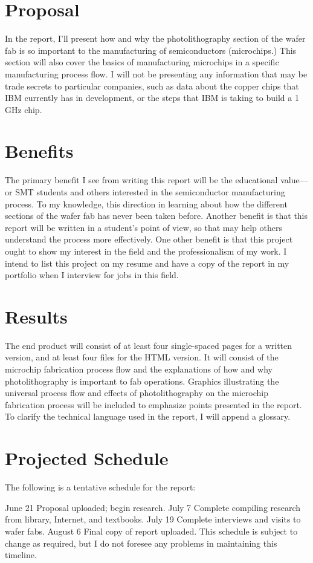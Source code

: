 \section*{Proposal}
In the report, I'll present how and why the photolithography section of the wafer fab is so important to the manufacturing of semiconductors (microchips.) This section will also cover the basics of manufacturing microchips in a specific manufacturing process flow. I will not be presenting any information that may be trade secrets to particular companies, such as data about the copper chips that IBM currently has in development, or the steps that IBM is taking to build a 1 GHz chip.
\section*{Benefits}
The primary benefit I see from writing this report will be the educational value—or SMT students and others interested in the semiconductor manufacturing process. To my knowledge, this direction in learning about how the different sections of the wafer fab has never been taken before. Another benefit is that this report will be written in a student's point of view, so that may help others understand the process more effectively. One other benefit is that this project ought to show my interest in the field and the professionalism of my work. I intend to list this project on my resume and have a copy of the report in my portfolio when I interview for jobs in this field.
\section*{Results}
The end product will consist of at least four single-spaced pages for a written version, and at least four files for the HTML version. It will consist of the microchip fabrication process flow and the explanations of how and why photolithography is important to fab operations. Graphics illustrating the universal process flow and effects of photolithography on the microchip fabrication process will be included to emphasize points presented in the report. To clarify the technical language used in the report, I will append a glossary.
\section*{Projected Schedule}
The following is a tentative schedule for the report:

June 21	Proposal uploaded; begin research.
July 7	Complete compiling research from library, Internet, and textbooks.
July 19	Complete interviews and visits to wafer fabs.
August 6	Final copy of report uploaded.
This schedule is subject to change as required, but I do not foresee any problems in maintaining this timeline.
